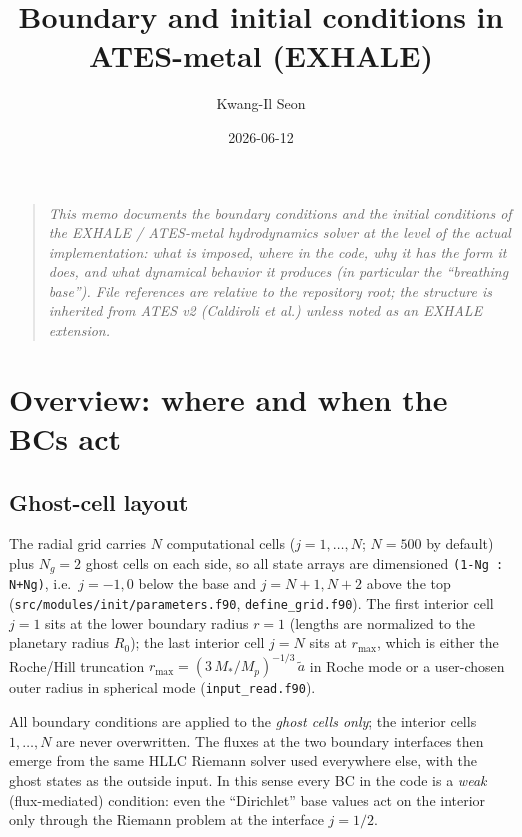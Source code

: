 \documentclass[english,a4paper]{kiseon_memo}
\title{Boundary and initial conditions in ATES-metal (EXHALE)}
\author{Kwang-Il Seon}
\date{2026-06-12}
\begin{document}
\maketitle

\begin{quote}\small\itshape
This memo documents the boundary conditions and the initial conditions
of the EXHALE / ATES-metal hydrodynamics solver at the level of the
actual implementation: what is imposed, where in the code, why it has
the form it does, and what dynamical behavior it produces (in
particular the ``breathing base''). File references are relative to
the repository root; the structure is inherited from ATES v2
(Caldiroli et al.) unless noted as an EXHALE extension.
\end{quote}

\tableofcontents

\section{Overview: where and when the BCs act}
\label{sec:overview}

\subsection{Ghost-cell layout}

The radial grid carries $N$ computational cells ($j = 1,\dots,N$;
$N=500$ by default) plus $N_g = 2$ ghost cells on each side, so all
state arrays are dimensioned \verb|(1-Ng : N+Ng)|, i.e.\ $j = -1, 0$
below the base and $j = N{+}1, N{+}2$ above the top
(\texttt{src/modules/init/parameters.f90}, \texttt{define\_grid.f90}).
The first interior cell $j=1$ sits at the lower boundary radius
$r = 1$ (lengths are normalized to the planetary radius $R_0$); the
last interior cell $j=N$ sits at $r_{\max}$, which is either the
Roche/Hill truncation $r_{\max} = (3\,M_*/M_p)^{-1/3}\,\tilde a$ in
Roche mode or a user-chosen outer radius in spherical mode
(\texttt{input\_read.f90}).

All boundary conditions are applied to the \emph{ghost cells only};
the interior cells $1,\dots,N$ are never overwritten. The fluxes at
the two boundary interfaces then emerge from the same HLLC Riemann
solver used everywhere else, with the ghost states as the outside
input. In this sense every BC in the code is a \emph{weak} (flux-mediated)
condition: even the ``Dirichlet'' base values act on the interior only
through the Riemann problem at the interface $j = 1/2$.
\end{document}
